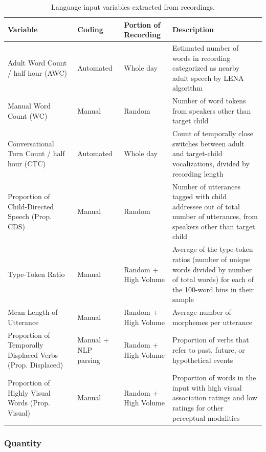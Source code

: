 \documentclass[
  man]{apa6}
\begin{document}
\begin{table}

\caption{\label{tab:variables-table}Language input variables extracted from recordings.}
\centering
\fontsize{9}{11}\selectfont
\begin{tabular}[t]{>{\raggedright\arraybackslash}p{1.4in}|>{\centering\arraybackslash}p{.8in}|>{\centering\arraybackslash}p{.75in}|>{\raggedright\arraybackslash}p{2.8in}}
\hline
Variable & Coding & Portion of Recording & Description\\
\hline
Adult Word Count / half hour (AWC) & Automated & Whole day & Estimated number of words in recording categorized as nearby adult speech by LENA algorithm\\
\hline
Manual Word Count (WC) & Manual & Random & Number of word tokens from speakers other than target child\\
\hline
Conversational Turn Count / half hour (CTC) & Automated & Whole day & Count of temporally close switches between adult and target-child vocalizations, divided by recording length\\
\hline
Proportion of Child-Directed Speech (Prop. CDS) & Manual & Random & Number of utterances tagged with child addressee out of total number of utterances, from speakers other than target child\\
\hline
Type-Token Ratio & Manual & Random + High Volume & Average of the type-token ratios (number of unique words divided by number of total words) for each of the 100-word bins in their sample\\
\hline
Mean Length of Utterance & Manual & Random + High Volume & Average number of morphemes per utterance\\
\hline
Proportion of Temporally Displaced Verbs (Prop. Displaced) & Manual + NLP parsing & Random + High Volume & Proportion of verbs that refer to past, future, or hypothetical events\\
\hline
Proportion of Highly Visual Words (Prop. Visual) & Manual & Random + High Volume & Proportion of words in the input with high visual association ratings and low ratings for other perceptual modalities\\
\hline
\end{tabular}
\end{table}

\hypertarget{quantity}{%
\subsubsection{Quantity}\label{quantity}}
\end{document}
